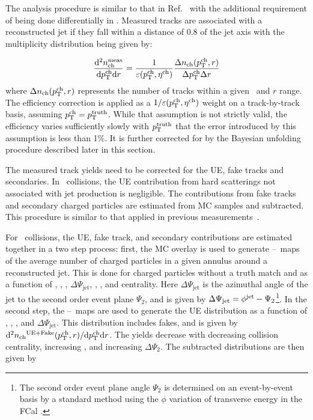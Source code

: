 
The analysis procedure is similar to that in Ref.~\cite{Aaboud:2018hpb} with the additional requirement of being done differentially in \rvar. Measured tracks are associated with a reconstructed jet if they fall within a distance of $0.8$ of the jet axis with the multiplicity distribution being given by:

\begin{align*}
\dfrac{\mathrm{d}^{2} \mbox{$n_{\mathrm{ch}}^{\mathrm{meas}}$} }{ \mathrm{d} \mbox{$p_{\mathrm{T}}^{\mathrm{ch}}$} \mathrm{d} r} = \frac{1}{\varepsilon(\mbox{$p_{\mathrm{T}}^{\mathrm{ch}}$},\mbox{$\eta^{\mathrm{ch}}$})} \frac{\Delta \mbox{$n_{\mathrm{ch}}$}( \mbox{$p_{\mathrm{T}}^{\mathrm{ch}}$}, r)}{ \Delta\mbox{$p_{\mathrm{T}}^{\mathrm{ch}}$} \Delta r}
\end{align*}
where $\Delta \mbox{$n_{\mathrm{ch}}$} (\mbox{$p_{\mathrm{T}}^{\mathrm{ch}}$}, r)$ represents the number of tracks within a given \pttrk\ and $r$ range. The efficiency correction is applied as a $1/\varepsilon(\mbox{$p_{\mathrm{T}}^{\mathrm{ch}}$},\mbox{$\eta^{\mathrm{ch}}$})$ weight on a track-by-track basis, assuming $\mbox{$p_{\mathrm{T}}^{\mathrm{ch}}$} = \mbox{$p_{\mathrm{T}}^{\mathrm{truth}}$}$. While that assumption is not strictly valid, the efficiency varies sufficiently slowly with $\mbox{$p_{\mathrm{T}}^{\mathrm{truth}}$}$ that the error
introduced by this assumption is less than 1\%. It is further corrected for by the Bayesian unfolding procedure described later in this section.

The measured track yields need to be corrected for the UE, fake tracks and secondaries. In \pp\ collisions, the UE contribution from hard scatterings not associated with jet production is negligible. The contributions from fake tracks and secondary charged particles are estimated from MC samples and subtracted. This procedure is similar to that applied in previous measurements~\cite{Aaboud:2017tke,Aaboud:2018hpb}.


For \pbpb\ collisions, the UE, fake track, and secondary contributions are estimated together in a two step process: 
first, the MC overlay is used to generate \etajet--\phijet\ maps of the average number of charged particles in a given
 annulus around a reconstructed jet. This is done for charged particles without a truth match and as a function of
  \ptjet, \etajet, \phijet,  $\Delta\Psi_{\mathrm{jet}}$, \rvar, \pttrk, and centrality. Here $\Delta\Psi_{\mathrm{jet}}$ is
   the azimuthal angle of the jet to the second order event plane $\Psi_2$, and is given by $ \Delta\Psi_{\mathrm{jet}} 
   = \mbox{$\phi^{\mathrm{jet}}$} - \Psi_2$\footnote{The second order event plane angle $\Psi_2$ is determined on an event-by-event basis by a standard method using the $\phi$ variation of transverse energy in the FCal \cite{ATLAS:2012at}.}. In the second step, the \etajet--\phijet\ maps are used to generate the 
   UE distribution as a function of \ptjet, \etajet, \phijet, and $\Delta\Psi_{\mathrm{jet}}$. This distribution includes
    fakes, and is given by \mbox{$\mathrm{d}^2 \mbox{$n_{\mathrm{ch}}$}^{\mathrm{UE+Fake}}(\mbox{$p_{\mathrm{T}}^{\mathrm{ch}}$}, r) / \mathrm{d} \mbox{$p_{\mathrm{T}}^{\mathrm{ch}}$} \mathrm{d} r$}. The yields decrease with
     decreasing collision centrality, increasing \pttrk, and increasing $\Delta\Psi_2$. The subtracted distributions are then given by 

